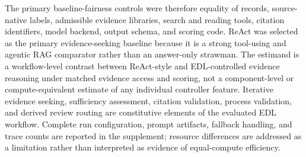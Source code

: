 \documentclass[11pt,a4paper]{article}
\begin{document}
The primary baseline-fairness controls were therefore equality of records, source-native labels, admissible evidence libraries, search and reading tools, citation identifiers, model backend, output schema, and scoring code. ReAct was selected as the primary evidence-seeking baseline because it is a strong tool-using and agentic RAG comparator rather than an answer-only strawman. The estimand is a workflow-level contrast between ReAct-style and EDL-controlled evidence reasoning under matched evidence access and scoring, not a component-level or compute-equivalent estimate of any individual controller feature. Iterative evidence seeking, sufficiency assessment, citation validation, process validation, and derived review routing are constitutive elements of the evaluated EDL workflow. Complete run configuration, prompt artifacts, fallback handling, and trace counts are reported in the supplement; resource differences are addressed as a limitation rather than interpreted as evidence of equal-compute efficiency.

\begin{table}[H]
\centering
\caption{Comparison methods.}
\end{table}
\end{document}
